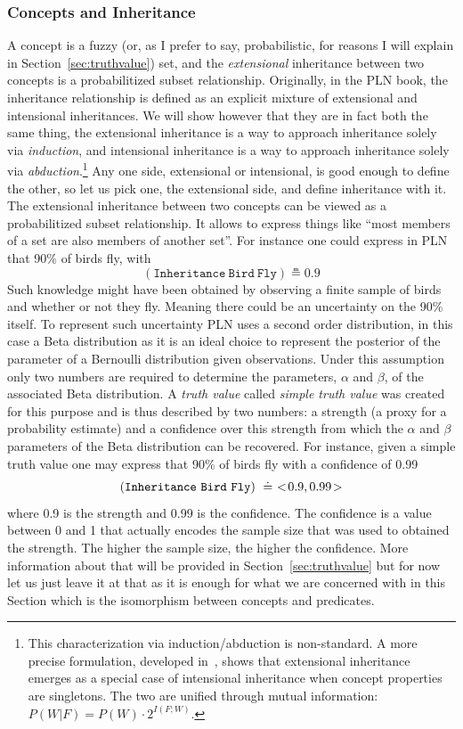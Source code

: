 \documentclass[]{article}
\begin{document}
\subsubsection{Concepts and Inheritance}
A concept is a fuzzy (or, as I prefer to say, probabilistic, for
reasons I will explain in Section~\ref{sec:truthvalue}) set, and the
\emph{extensional} inheritance between two concepts is a
probabilitized subset relationship.  Originally, in the PLN book, the
inheritance relationship is defined as an explicit mixture of
extensional and intensional inheritances. We will show however that
they are in fact both the same thing, the extensional inheritance is a
way to approach inheritance solely via \emph{induction}, and
intensional inheritance is a way to approach inheritance solely via
\emph{abduction}.\footnote{This characterization via induction/abduction is non-standard. A more precise formulation, developed in~\cite{goertzel2025intensional}, shows that extensional inheritance emerges as a special case of intensional inheritance when concept properties are singletons. The two are unified through mutual information: $P(W|F) = P(W) \cdot 2^{I(F;W)}$.}  Any one side, extensional or intensional, is good
enough to define the other, so let us pick one, the extensional side,
and define inheritance with it.  The extensional inheritance between
two concepts can be viewed as a probabilitized subset relationship.
It allows to express things like ``most members of a set are also
members of another set''.  For instance one could express in PLN that
90\% of birds fly, with
$$(\texttt{Inheritance}\ \texttt{Bird}\ \texttt{Fly}) \measeq 0.9$$
Such knowledge might have been obtained by observing a finite sample
of birds and whether or not they fly.  Meaning there could be an
uncertainty on the 90\% itself.  To represent such uncertainty PLN
uses a second order distribution, in this case a Beta distribution as
it is an ideal choice to represent the posterior of the parameter of a
Bernoulli distribution given observations.  Under this assumption
only two numbers are required to determine the parameters, $\alpha$
and $\beta$, of the associated Beta distribution.  A \emph{truth
value} called \emph{simple truth value} was created for this purpose
and is thus described by two numbers: a strength (a proxy for a
probability estimate) and a confidence over this strength from which
the $\alpha$ and $\beta$ parameters of the Beta distribution can be
recovered.  For instance, given a simple truth value one may express
that 90\% of birds fly with a confidence of 0.99
$$(\texttt{Inheritance}\ \texttt{Bird}\ \texttt{Fly})\ \measeq\ \STV{0.9}{0.99}$$
where 0.9 is the strength and 0.99 is the confidence.  The confidence
is a value between 0 and 1 that actually encodes the sample size that
was used to obtained the strength.  The higher the sample size, the
higher the confidence.  More information about that will be provided
in Section~\ref{sec:truthvalue} but for now let us just leave it at that as it
is enough for what we are concerned with in this Section which is the
isomorphism between concepts and predicates.
\end{document}
